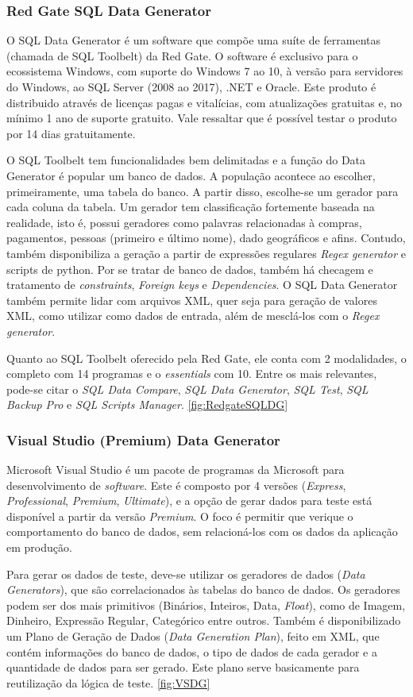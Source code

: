 \documentclass[
	12pt,				%
	openright,			%
	twoside,			%
	a4paper,			%
	english,			%
	brazil				%
	]{abntex2}
\begin{document}
	\subsubsection{Red Gate SQL Data Generator}
	O SQL Data Generator \cite{RedgateSQLDataGenerator} é um software que compõe uma suíte de ferramentas (chamada de SQL Toolbelt) da Red Gate.
	O software é exclusivo para o ecossistema Windows, com suporte do Windows 7 ao 10, à versão para servidores do Windows, ao SQL Server (2008 ao 2017), .NET e Oracle.
	Este produto é distribuido através de licenças pagas e vitalícias, com atualizações gratuitas e, no mínimo 1 ano de suporte gratuito.
	Vale ressaltar que é possível testar o produto por 14 dias gratuitamente.
	\par
	O SQL Toolbelt tem funcionalidades bem delimitadas e a função do Data Generator é popular um banco de dados. 
	A população acontece ao escolher, primeiramente, uma tabela do banco.
	A partir disso, escolhe-se um gerador para cada coluna da tabela.
	Um gerador tem classificação fortemente baseada na realidade, isto é, possui geradores como palavras relacionadas à compras, pagamentos, pessoas (primeiro e último nome), dado geográficos e afins.
	Contudo, também disponibiliza a geração a partir de expressões regulares \emph{Regex generator} e scripts de python.
	Por se tratar de banco de dados, também há checagem e tratamento de \emph{constraints}, \emph{Foreign keys} e \emph{Dependencies}.
	O SQL Data Generator também permite lidar com arquivos XML, quer seja para geração de valores XML, como utilizar como dados de entrada, além de mesclá-los com o \emph{Regex generator}.
	\par
	Quanto ao SQL Toolbelt oferecido pela Red Gate, ele conta com 2 modalidades, o completo com 14 programas e o \emph{essentials} com 10.
	Entre os mais relevantes, pode-se citar o \emph{SQL Data Compare}, \emph{SQL Data Generator}, \emph{SQL Test}, \emph{SQL Backup Pro} e \emph{SQL Scripts Manager}.
	\ref{fig:RedgateSQLDG}
	\subsubsection{Visual Studio (Premium) Data Generator}
	Microsoft Visual Studio \cite{VSDataGenerator} é um pacote de programas da Microsoft para desenvolvimento de \emph{software}. 
	Este é composto por 4 versões (\emph{Express}, \emph{Professional}, \emph{Premium}, \emph{Ultimate}), e a opção de gerar dados para teste está disponível a partir da versão \emph{Premium}.
	O foco é permitir que verique o comportamento do banco de dados, sem relacioná-los com os dados da aplicação em produção.
	\par
	Para gerar os dados de teste, deve-se utilizar os geradores de dados (\emph{Data Generators}), que são correlacionados às tabelas do banco de dados.
		Os geradores podem ser dos mais primitivos (Binários, Inteiros, Data, \emph{Float}), como de Imagem, Dinheiro, Expressão Regular, Categórico entre outros.
	Também é disponibilizado um Plano de Geração de Dados (\emph{Data Generation Plan}), feito em XML, que contém informações do banco de dados, o tipo de dados de cada gerador e a quantidade de dados para ser gerado. 
	Este plano serve basicamente para reutilização da lógica de teste.
	\ref{fig:VSDG}
\end{document}
